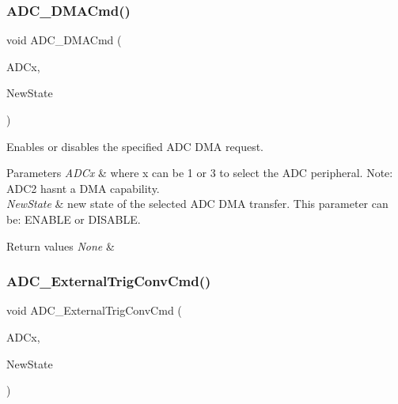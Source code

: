\subsubsection{\texorpdfstring{ADC\_DMACmd()}{ADC\_DMACmd()}}
{\footnotesize\ttfamily void A\+D\+C\+\_\+\+D\+M\+A\+Cmd (\begin{DoxyParamCaption}\item[{\mbox{\hyperlink{struct_a_d_c___type_def}{A\+D\+C\+\_\+\+Type\+Def}} $\ast$}]{A\+D\+Cx,  }\item[{\mbox{\hyperlink{group___exported__types_gac9a7e9a35d2513ec15c3b537aaa4fba1}{Functional\+State}}}]{New\+State }\end{DoxyParamCaption})}



Enables or disables the specified A\+DC D\+MA request. 


\begin{DoxyParams}{Parameters}
{\em A\+D\+Cx} & where x can be 1 or 3 to select the A\+DC peripheral. Note\+: A\+D\+C2 hasn\textquotesingle{}t a D\+MA capability. \\
\hline
{\em New\+State} & new state of the selected A\+DC D\+MA transfer. This parameter can be\+: E\+N\+A\+B\+LE or D\+I\+S\+A\+B\+LE. \\
\hline
\end{DoxyParams}

\begin{DoxyRetVals}{Return values}
{\em None} & \\
\hline
\end{DoxyRetVals}
\mbox{\label{group___a_d_c___exported___functions_ga3ae92d7940a16c898223374a5857f509}} 
\subsubsection{\texorpdfstring{ADC\_ExternalTrigConvCmd()}{ADC\_ExternalTrigConvCmd()}}
{\footnotesize\ttfamily void A\+D\+C\+\_\+\+External\+Trig\+Conv\+Cmd (\begin{DoxyParamCaption}\item[{\mbox{\hyperlink{struct_a_d_c___type_def}{A\+D\+C\+\_\+\+Type\+Def}} $\ast$}]{A\+D\+Cx,  }\item[{\mbox{\hyperlink{group___exported__types_gac9a7e9a35d2513ec15c3b537aaa4fba1}{Functional\+State}}}]{New\+State }\end{DoxyParamCaption})}



